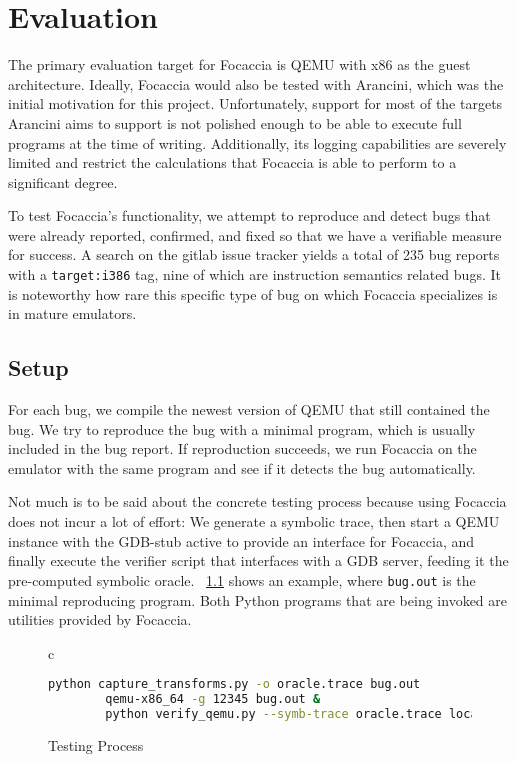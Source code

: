 \chapter{Evaluation}

The primary evaluation target for Focaccia is QEMU with x86 as the guest architecture. Ideally, Focaccia would also be
tested with Arancini, which was the initial motivation for this project. Unfortunately, support for most of the targets
Arancini aims to support is not polished enough to be able to execute full programs at the time of writing.
Additionally, its logging capabilities are severely limited and restrict the calculations that Focaccia is able to
perform to a significant degree.

To test Focaccia's functionality, we attempt to reproduce and detect bugs that were already reported, confirmed, and
fixed so that we have a verifiable measure for success. A search on the gitlab issue tracker yields a total of 235 bug
reports with a \texttt{target:i386} tag, nine of which are instruction semantics related bugs. It is noteworthy how rare
this specific type of bug on which Focaccia specializes is in mature emulators.

\section{Setup}

For each bug, we compile the newest version of QEMU that still contained the bug. We try to reproduce the bug with a
minimal program, which is usually included in the bug report. If reproduction succeeds, we run Focaccia on the emulator
with the same program and see if it detects the bug automatically.

Not much is to be said about the concrete testing process because using Focaccia does not incur a lot of effort: We
generate a symbolic trace, then start a QEMU instance with the GDB-stub active to provide an interface for Focaccia, and
finally execute the verifier script that interfaces with a GDB server, feeding it the pre-computed symbolic oracle.
\figurename~\ref{fig:testing_process} shows an example, where \texttt{bug.out} is the minimal reproducing program. Both
Python programs that are being invoked are utilities provided by Focaccia.

\begin{figure}[htbp]
    \centering
    \begin{tabular}{c}
    \begin{lstlisting}[language=bash]
        python capture_transforms.py -o oracle.trace bug.out
        qemu-x86_64 -g 12345 bug.out &
        python verify_qemu.py --symb-trace oracle.trace localhost 12345
    \end{lstlisting}
    \end{tabular}
    \caption{Testing Process}\label{fig:testing_process}
\end{figure}

